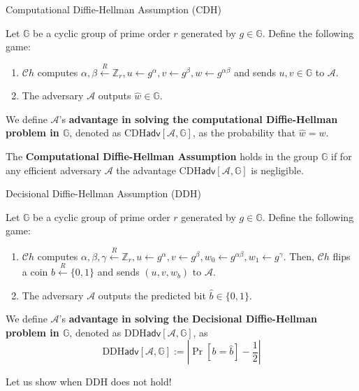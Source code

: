 \documentclass{beamer}
\begin{document}
    \begin{frame}{Computational Diffie-Hellman Assumption (CDH)}
        \begin{definition}
            Let $\mathbb{G}$ be a cyclic group of prime order $r$ generated by $g \in \mathbb{G}$. Define the following game:
            \begin{enumerate}
                \item $\mathcal{C}h$ computes $\alpha, \beta \xleftarrow{R} \mathbb{Z}_r, u \gets g^{\alpha}, v \gets g^{\beta}, w \gets g^{\alpha\beta}$ and sends $u,v \in \mathbb{G}$ to $\mathcal{A}$.\pause
                \item The adversary $\mathcal{A}$ outputs $\hat{w} \in \mathbb{G}$.\pause
            \end{enumerate}
        
            We define $\mathcal{A}$'s \textbf{advantage in solving the computational Diffie-Hellman problem in $\mathbb{G}$}, denoted as $\text{CDH}\mathsf{adv}[\mathcal{A},\mathbb{G}]$, as the probability that $\hat{w} = w$.\pause
        \end{definition}
        
        \begin{definition}
            The \textbf{Computational Diffie-Hellman Assumption} holds in the group $\mathbb{G}$ if for any efficient adversary $\mathcal{A}$ the advantage $\text{CDH}\mathsf{adv}[\mathcal{A},\mathbb{G}]$ is negligible.
        \end{definition}
    \end{frame}

    \begin{frame}{Decisional Diffie-Hellman Assumption (DDH)}
        \begin{definition}
            Let $\mathbb{G}$ be a cyclic group of prime order $r$ generated by $g \in \mathbb{G}$. Define the following game:
            \begin{enumerate}
                \item $\mathcal{C}h$ computes $\alpha, \beta,\gamma \xleftarrow{R} \mathbb{Z}_r, u \gets g^{\alpha}, v \gets g^{\beta}, w_0 \gets g^{\alpha\beta}, w_1 \gets g^{\gamma}$. Then, $\mathcal{C}h$ flips a coin $b \xleftarrow{R} \{0,1\}$ and sends $(u,v,w_b)$ to $\mathcal{A}$.\pause
                \item The adversary $\mathcal{A}$ outputs the predicted bit $\hat{b} \in \{0,1\}$.\pause
            \end{enumerate}
        
            We define $\mathcal{A}$'s \textbf{advantage in solving the Decisional Diffie-Hellman problem in $\mathbb{G}$}, denoted as $\text{DDH}\mathsf{adv}[\mathcal{A},\mathbb{G}]$, as
            \begin{equation*}
                \text{DDH}\mathsf{adv}[\mathcal{A},\mathbb{G}] := \left| \Pr[b = \hat{b}] - \frac{1}{2} \right|
            \end{equation*}
        \end{definition}

        Let us show when DDH does not hold!
    \end{frame}
\end{document}
